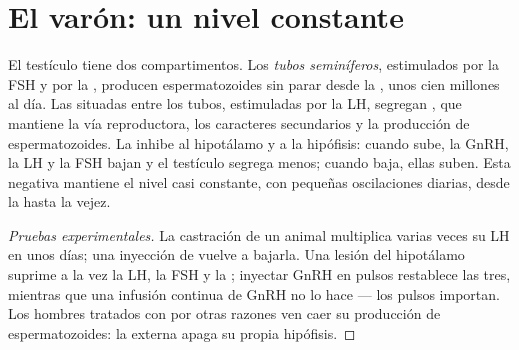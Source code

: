 \section{El varón: un nivel constante}

\begin{proposition}\label{prop:g11:hormones-and-reproduction:male}
El testículo tiene dos compartimentos. Los \emph{tubos seminíferos},
estimulados por la FSH y por la , producen espermatozoides
sin parar desde la , unos cien millones al día. Las 
situadas entre los tubos, estimuladas por la LH, segregan
\emph{}, que mantiene la vía reproductora, los caracteres
secundarios y la producción de espermatozoides. La  inhibe
al hipotálamo y a la hipófisis: cuando sube, la GnRH, la LH y la FSH
bajan y el testículo segrega menos; cuando baja, ellas suben. Esta
 negativa mantiene el nivel casi constante, con
pequeñas oscilaciones diarias, desde la  hasta la vejez.
\end{proposition}
\begin{proof}[Pruebas experimentales]
La castración de un animal multiplica varias veces su LH en unos días;
una inyección de  vuelve a bajarla. Una lesión del
hipotálamo suprime a la vez la LH, la FSH y la ; inyectar
GnRH en pulsos restablece las tres, mientras que una infusión continua
de GnRH no lo hace --- los pulsos importan. Los hombres tratados con
 por otras razones ven caer su producción de
espermatozoides: la  externa apaga su propia hipófisis.
\end{proof}

